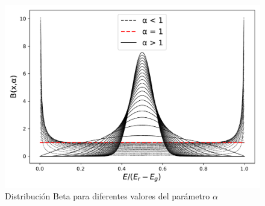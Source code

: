 \begin{figure}[H]
    \centering
    \includegraphics[scale=.7]{Figs/BetaDistFig.pdf}
    \caption{\footnotesize{Distribución Beta para diferentes valores del parámetro $\alpha$}}
    \label{fig:BetaDist}
\end{figure}

